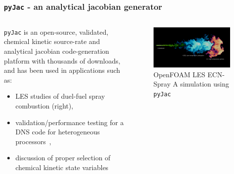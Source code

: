 \documentclass{beamer}
\begin{document}
\begin{frame}
 \frametitle{\texttt{pyJac} - an analytical jacobian generator}
 \begin{columns}[c]
  \begin{column}{0.6\textwidth}
  \begin{minipage}[c]{\columnwidth}
    \texttt{pyJac} is an open-source, validated, chemical kinetic source-rate and analytical jacobian code-generation platform with thousands of downloads, and has been used in applications such as:
    \begin{itemize}
     \item LES studies of duel-fuel spray combustion (right),
     \item validation\slash performance testing for a DNS code for heterogeneous processors~,
     \item discussion of proper selection of chemical kinetic state variables~
    \end{itemize}
    \vfill
  \end{minipage}
  \end{column}
  \begin{column}{0.4\textwidth}
    \begin{center}
     \begin{figure}
      \centering
      \includegraphics[width=\columnwidth]{spray.png}
      \caption{OpenFOAM LES ECN-Spray A simulation using \texttt{pyJac}}
     \end{figure}
    \end{center}
  \end{column}
 \end{columns}
\end{frame}
\end{document}
